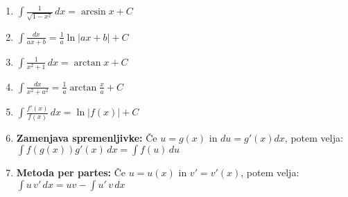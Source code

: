 \begin{center}
\begin{small}
\begin{enumerate}
			\item \begin{math}
				      \int {\frac{1}{\sqrt{1-x^2}}} \, dx = \arcsin {x} + C
			      \end{math}
			\item \begin{math}
				      \int \frac{dx}{ax + b} = \frac{1}{a} \ln |ax + b| + C
			      \end{math}
			\item \begin{math}
				      \int \frac{1}{x^2 + 1} \, dx = \arctan x + C
			      \end{math}
			\item \begin{math}
				      \int \frac{dx}{x^2 + a^2} = \frac{1}{a} \arctan \frac{x}{a} + C
			      \end{math}
			\item \begin{math}
				      \int \frac{f'(x)}{f(x)} \, dx = \ln|f(x)| + C
			      \end{math}
			\item \textbf{Zamenjava spremenljivke:} Če $u = g(x)$ in $du = g'(x)dx$, potem velja:
			      \begin{math}
				      \int f(g(x))g'(x)\,dx = \int f(u)\,du
			      \end{math}
			\item \textbf{Metoda per partes:} Če $u = u(x)$ in $v' = v'(x)$, potem velja:
			      \begin{math}
				      \int u\,v'\,dx = uv - \int u'\,v\,dx
			      \end{math}
		\end{enumerate}
	\end{small}
\end{center}

